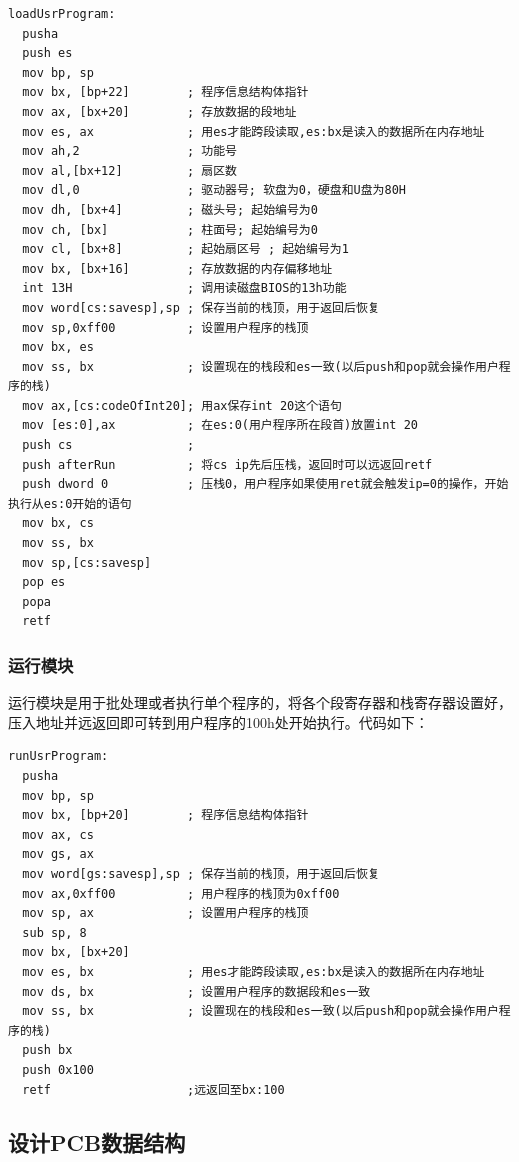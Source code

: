 \documentclass[a4paper, 11pt]{article} %
\newcounter{code}
\begin{document}
\begin{lstlisting}[language={[x86masm]Assembler},label=loadUsrProgram,caption=loadUsrProgram]
  loadUsrProgram:    
  pusha
  push es       
  mov bp, sp
  mov bx, [bp+22]        ; 程序信息结构体指针
  mov ax, [bx+20]        ; 存放数据的段地址
  mov es, ax             ; 用es才能跨段读取,es:bx是读入的数据所在内存地址
  mov ah,2               ; 功能号
  mov al,[bx+12]         ; 扇区数
  mov dl,0               ; 驱动器号; 软盘为0，硬盘和U盘为80H
  mov dh, [bx+4]         ; 磁头号; 起始编号为0
  mov ch, [bx]           ; 柱面号; 起始编号为0
  mov cl, [bx+8]         ; 起始扇区号 ; 起始编号为1
  mov bx, [bx+16]        ; 存放数据的内存偏移地址
  int 13H                ; 调用读磁盘BIOS的13h功能
  mov word[cs:savesp],sp ; 保存当前的栈顶，用于返回后恢复
  mov sp,0xff00          ; 设置用户程序的栈顶
  mov bx, es
  mov ss, bx             ; 设置现在的栈段和es一致(以后push和pop就会操作用户程序的栈)
  mov ax,[cs:codeOfInt20]; 用ax保存int 20这个语句
  mov [es:0],ax          ; 在es:0(用户程序所在段首)放置int 20
  push cs                ; 
  push afterRun          ; 将cs ip先后压栈，返回时可以远返回retf
  push dword 0           ; 压栈0，用户程序如果使用ret就会触发ip=0的操作，开始执行从es:0开始的语句
  mov bx, cs
  mov ss, bx
  mov sp,[cs:savesp]
  pop es
  popa
  retf
\end{lstlisting}

\subsubsection{运行模块}
运行模块是用于批处理或者执行单个程序的，将各个段寄存器和栈寄存器设置好，压入地址并远返回即可转到用户程序的100h处开始执行。代码如下：
\begin{lstlisting}[language={[x86masm]Assembler},label=runUsrProgram,caption=runUsrProgram]
  runUsrProgram:
  pusha
  mov bp, sp
  mov bx, [bp+20]        ; 程序信息结构体指针
  mov ax, cs
  mov gs, ax
  mov word[gs:savesp],sp ; 保存当前的栈顶，用于返回后恢复
  mov ax,0xff00          ; 用户程序的栈顶为0xff00
  mov sp, ax             ; 设置用户程序的栈顶
  sub sp, 8
  mov bx, [bx+20]
  mov es, bx             ; 用es才能跨段读取,es:bx是读入的数据所在内存地址
  mov ds, bx             ; 设置用户程序的数据段和es一致
  mov ss, bx             ; 设置现在的栈段和es一致(以后push和pop就会操作用户程序的栈)
  push bx
  push 0x100
  retf                   ;远返回至bx:100
\end{lstlisting}


\subsection{设计PCB数据结构}
\end{document}
